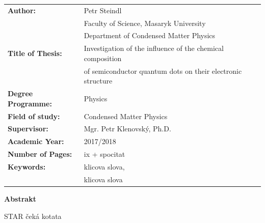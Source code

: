 \documentclass[
a4paper, %
11pt, %
onecolumn, %
openany, %
oldfontcommands,
]{memoir}
\begin{document}
\normalsize
\begin{tabular}{ll}
	\textbf{Author:} & Petr Steindl \\[-0.5cm]
	& Faculty of Science, Masaryk University \\[-0.5cm]
	& Department of Condensed Matter Physics \\[-0.5cm]
	\textbf{Title of Thesis:} &  Investigation of the influence of the chemical composition \\[-0.5cm]
	& of semiconductor quantum dots on their electronic structure\\
	\textbf{Degree Programme:}& Physics \\
	\textbf{Field of study:}& Condensed Matter Physics \\
	\textbf{Supervisor:}& Mgr. Petr Klenovský, Ph.D. \\
	\textbf{Academic Year:}& 2017/2018 \\
	\textbf{Number of Pages:}& ix + spocitat \\
	\textbf{Keywords:}& klicova slova,\\[-0.5cm]
	& klicova slova \\
\end{tabular}
\renewcommand{\arraystretch}{1} 
\newpage

\noindent\Large\textbf{Abstrakt}\\ \normalsize

STAR čeká kotata
\end{document}
